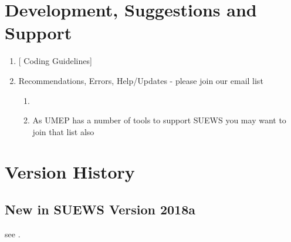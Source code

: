 \documentclass[letterpaper,10pt,english]{sphinxmanual}
\begin{document}
\chapter{Development, Suggestions and Support}
\label{\detokenize{development::doc}}\label{\detokenize{development:urban-multi-scale-environmental-predictor}}\label{\detokenize{development:development-suggestions-and-support}}\begin{enumerate}
\item {} 
{[}\textbar{}
Coding Guidelines{]}

\item {} 
Recommendations, Errors, Help/Updates - please join our email list
\begin{enumerate}
\item {} 

\item {} 
As UMEP has a number of tools to support SUEWS you may want to
join that list also

\end{enumerate}

\end{enumerate}


\chapter{Version History}
\label{\detokenize{version-history:ch-ver-history}}\label{\detokenize{version-history:version-history}}\label{\detokenize{version-history::doc}}

\section{New in SUEWS Version 2018a}
\label{\detokenize{version-history:new-latest}}\label{\detokenize{version-history:new-in-suews-version-2018a}}
see {\hyperref[\detokenize{version-history:ch-ver-history}]{}}.
\end{document}
